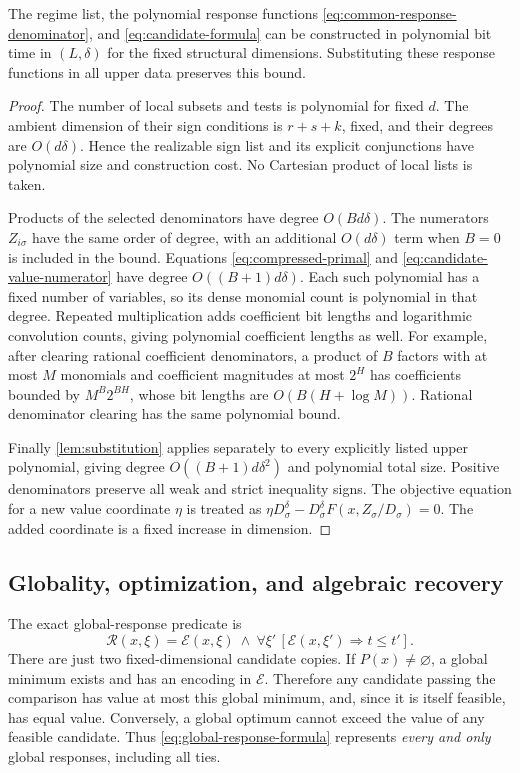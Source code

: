 \begin{lemma}\label{lem:candidate-size}
The regime list, the polynomial response functions
\eqref{eq:common-response-denominator}, and \eqref{eq:candidate-formula}
can be constructed in polynomial bit time in $(L,\delta)$ for the fixed
structural dimensions. Substituting these response functions in all
upper data preserves this bound.
\end{lemma}
\begin{proof}
The number of local subsets and tests is polynomial for fixed $d$.
The ambient dimension of their sign conditions is $r+s+k$, fixed, and
their degrees are $O(d\delta)$. Hence the realizable sign list and its
explicit conjunctions have polynomial size and construction cost. No
Cartesian product of local lists is taken.

Products of the selected denominators have degree $O(Bd\delta)$.
The numerators $Z_{i\sigma}$ have the same order of degree, with an
additional $O(d\delta)$ term when $B=0$ is included in the bound.
Equations \eqref{eq:compressed-primal} and
\eqref{eq:candidate-value-numerator} have degree $O((B+1)d\delta)$.
Each such polynomial has a fixed number of variables, so its dense
monomial count is polynomial in that degree. Repeated multiplication
adds coefficient bit lengths and logarithmic convolution counts, giving
polynomial coefficient lengths as well. For example, after clearing
rational coefficient denominators, a product of $B$ factors with at most
$M$ monomials and coefficient magnitudes at most $2^H$ has coefficients
bounded by $M^B2^{BH}$, whose bit lengths are $O(B(H+\log M))$.
Rational denominator clearing has the same polynomial bound.

Finally \cref{lem:substitution} applies separately to every explicitly
listed upper polynomial, giving degree $O((B+1)d\delta^2)$ and
polynomial total size. Positive denominators preserve all weak and
strict inequality signs. The objective equation for a new value
coordinate $\eta$ is treated as
$\eta D_\sigma^\delta-D_\sigma^\delta F(x,Z_\sigma/D_\sigma)=0$.
The added coordinate is a fixed increase in dimension.
\end{proof}

\subsection{Globality, optimization, and algebraic recovery}\label{subsec:global-comparison}

The exact global-response predicate is
\begin{equation}\label{eq:global-response-formula}
 \mathcal R(x,\xi)=\mathcal E(x,\xi)\ \wedge\
 \forall\xi'\,[\mathcal E(x,\xi')\Longrightarrow t\le t'].
\end{equation}
There are just two fixed-dimensional candidate copies. If
$P(x)\ne\varnothing$, a global minimum exists and has an encoding in
$\mathcal E$. Therefore any candidate passing the comparison has value
at most this global minimum, and, since it is itself feasible, has equal
value. Conversely, a global optimum cannot exceed the value of any
feasible candidate. Thus \eqref{eq:global-response-formula} represents
\emph{every and only} global responses, including all ties.

